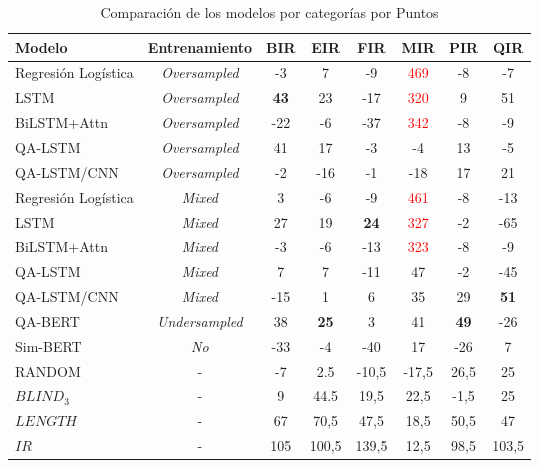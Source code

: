 \begin{table}[!tb]
  \begin{center}
    \caption{Comparación de los modelos por categorías por Puntos}
    \begin{tabular}{l|c|c|c|c|c|c|c}
      \textbf{Modelo} & \textbf{Entrenamiento} & \textbf{BIR} & \textbf{EIR} & \textbf{FIR} & \textbf{MIR} & \textbf{PIR} & \textbf{QIR}\\
      \hline
      Regresión Logística & \textit{Oversampled} & -3 & 7 & -9 & \textcolor{red}{469} & -8 & -7 \\
      LSTM & \textit{Oversampled} & \textbf{43} & 23 & -17 & \textcolor{red}{320} & 9 & 51\\
      BiLSTM+Attn & \textit{Oversampled} & -22 & -6 & -37 & \textcolor{red}{342} & -8 & -9\\
      QA-LSTM & \textit{Oversampled} & 41 & 17 & -3 & -4 & 13 & -5\\
      QA-LSTM/CNN & \textit{Oversampled} & -2 & -16 & -1 & -18 & 17 & 21\\

      Regresión Logística & \textit{Mixed} & 3 & -6 & -9 & \textcolor{red}{461} & -8 & -13\\
      LSTM & \textit{Mixed} & 27 & 19 & \textbf{24} & \textcolor{red}{327} & -2 & -65\\
      BiLSTM+Attn & \textit{Mixed} & -3 & -6 & -13 & \textcolor{red}{323} & -8 & -9 \\
      QA-LSTM & \textit{Mixed} & 7 & 7 & -11 & 47 & -2 & -45 \\
      QA-LSTM/CNN & \textit{Mixed} & -15 & 1 & 6 & 35 & 29 & \textbf{51} \\

      QA-BERT & \textit{Undersampled} & 38 & \textbf{25} & 3 & 41 & \textbf{49} & -26 \\
      Sim-BERT & \textit{No} & -33 & -4 & -40 & 17 & -26 & 7 \\
      \hline
      RANDOM & - & -7 & 2.5 & -10,5 & -17,5 & 26,5 & 25 \\
      $BLIND_3$ & - & 9 & 44.5 & 19,5 & 22,5 & -1,5 & 25 \\
      $LENGTH$ & - & 67 & 70,5 & 47,5 & 18,5 & 50,5 & 47 \\
      $IR$ & - & 105 & 100,5 & 139,5 & 12,5 & 98,5 & 103,5 \\
    \end{tabular}
  \end{center}
  \label{comparison_points}
\end{table}

